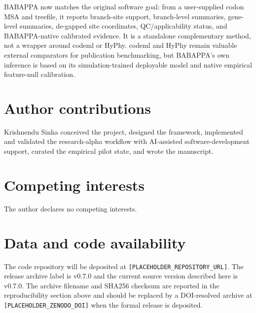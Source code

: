 \documentclass[11pt,a4paper]{article}
\newcommand{\ProjectVersion}{v0.7.0}
\newcommand{\ReleaseArchiveLabel}{v0.7.0}
\newcommand{\RepoURL}{[PLACEHOLDER\_REPOSITORY\_URL]}
\newcommand{\ZenodoDOI}{[PLACEHOLDER\_ZENODO\_DOI]}
\begin{document}
BABAPPA now matches the original software goal: from a user-supplied codon MSA and treefile, it reports branch-site support, branch-level summaries, gene-level summaries, de-gapped site coordinates, QC/applicability status, and BABAPPA-native calibrated evidence. It is a standalone complementary method, not a wrapper around codeml or HyPhy. codeml and HyPhy remain valuable external comparators for publication benchmarking, but BABAPPA's own inference is based on its simulation-trained deployable model and native empirical feature-null calibration.

\section*{Author contributions}

Krishnendu Sinha conceived the project, designed the framework, implemented and validated the research-alpha workflow with AI-assisted software-development support, curated the empirical pilot state, and wrote the manuscript.

\section*{Competing interests}

The author declares no competing interests.

\section*{Data and code availability}

The code repository will be deposited at \texttt{\RepoURL}. The release archive label is \ReleaseArchiveLabel{} and the current source version described here is \ProjectVersion{}. The archive filename and SHA256 checksum are reported in the reproducibility section above and should be replaced by a DOI-resolved archive at \texttt{\ZenodoDOI} when the formal release is deposited.



\end{document}
